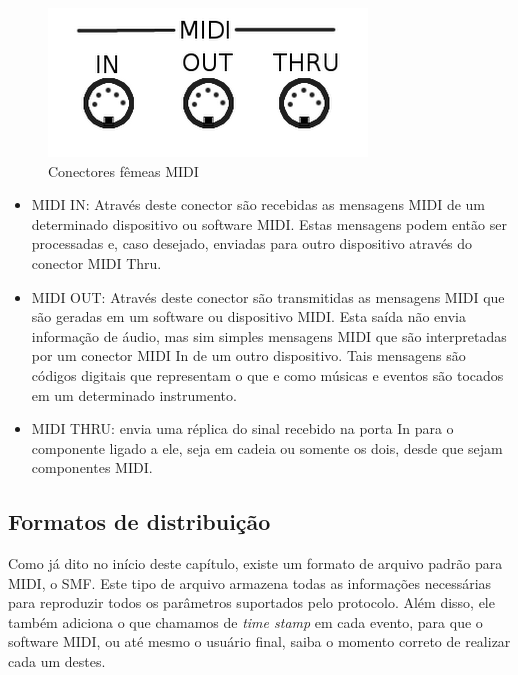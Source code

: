             \begin{figure}[H]
            	\centering
            	\includegraphics[scale=0.8]{Imagens/midi_in_out_thru.png}
            	\caption[Conectores fêmeas MIDI]{Conectores fêmeas MIDI}
            	\label{fig:MIDI_connector_Female}
            \end{figure}

            \begin{itemize}
                \item MIDI IN: Através deste conector são recebidas as mensagens MIDI de um determinado dispositivo ou software MIDI. Estas mensagens podem então ser processadas e, caso desejado, enviadas para outro dispositivo através do conector MIDI Thru.

                \item MIDI OUT: Através deste conector são transmitidas as mensagens MIDI que são geradas em um software ou dispositivo MIDI. Esta saída não envia informação de áudio, mas sim simples mensagens MIDI que são interpretadas por um conector MIDI In de um outro dispositivo. Tais mensagens são códigos digitais que representam o que e como músicas e eventos são tocados em um determinado instrumento.

                \item MIDI THRU: envia uma réplica do sinal recebido na porta In para o componente ligado a ele, seja em cadeia ou somente os dois, desde que sejam componentes MIDI.
            \end{itemize}

        \subsection{Formatos de distribuição}

            Como já dito no início deste capítulo, existe um formato de arquivo padrão para MIDI, o SMF. Este tipo de arquivo armazena todas as informações necessárias para reproduzir todos os parâmetros suportados pelo protocolo. Além disso, ele também adiciona o que chamamos de \textit{time stamp} em cada evento, para que o software MIDI, ou até mesmo o usuário final, saiba o momento correto de realizar cada um destes.

